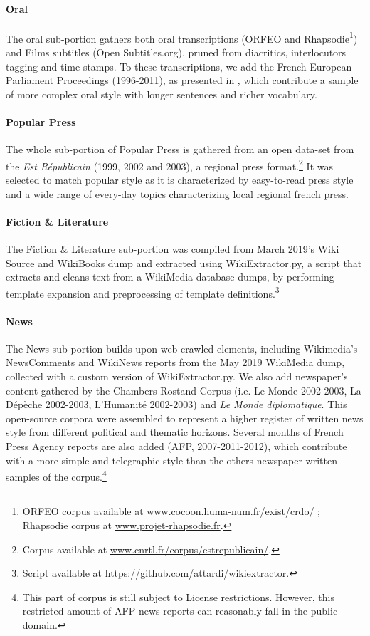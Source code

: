 \paragraph{\Cabernet Oral} \label{subsec:DescribeCaBeRnetOral}
The oral sub-portion gathers both oral transcriptions (\textsc{ORFEO} and Rhapsodie\footnote{\textsc{ORFEO} corpus available at \url{www.cocoon.huma-num.fr/exist/crdo/} ; Rhapsodie corpus at \url{www.projet-rhapsodie.fr}.}) and Films subtitles (Open Subtitles.org), pruned from diacritics, interlocutors tagging and time stamps. To these transcriptions, we add the French European Parliament Proceedings (1996-2011), as presented in \citet{koehn-2005-europarl}, which contribute a sample of more complex oral style with longer sentences and richer vocabulary.

\paragraph{\Cabernet Popular Press} \label{subsec:DescribeCaBeRnetPop}
The whole sub-portion of Popular Press is gathered from an open data-set from the \textit{Est Républicain} (1999, 2002 and 2003), a regional press format.\footnote{Corpus available at \url{www.cnrtl.fr/corpus/estrepublicain/}.} It was selected to match popular style as it is characterized by easy-to-read press style and a wide range of every-day topics characterizing local regional french press.

\paragraph{\Cabernet Fiction \& Literature} \label{subsec:DescribeCaBeRnetFic}
The Fiction \& Literature sub-portion was compiled from March 2019's Wiki Source and WikiBooks dump and extracted using WikiExtractor.py, a script that extracts and cleans text from a WikiMedia database dumps, by performing template expansion and preprocessing of template definitions.\footnote{Script available at \url{https://github.com/attardi/wikiextractor}.}

\paragraph{\Cabernet News} \label{subsec:DescribeCaBeRnetNews}
The News sub-portion builds upon web crawled elements, including Wikimedia's NewsComments and WikiNews reports from the May 2019 WikiMedia dump, collected with a custom version of WikiExtractor.py. We also add newspaper's content gathered by the Chambers-Rostand Corpus (i.e. Le Monde 2002-2003, La Dépèche 2002-2003, L'Humanité 2002-2003) and \emph{Le Monde diplomatique}. This open-source corpora were assembled to represent a higher register of written news style from different political and thematic horizons. Several months of French Press Agency reports are also added (AFP, 2007-2011-2012), which contribute with a more simple and telegraphic style than the others newspaper written samples of the corpus.\footnote{This part of \Cabernet corpus is still subject to License restrictions. However, this restricted amount of AFP news reports can reasonably fall in the public domain.}

